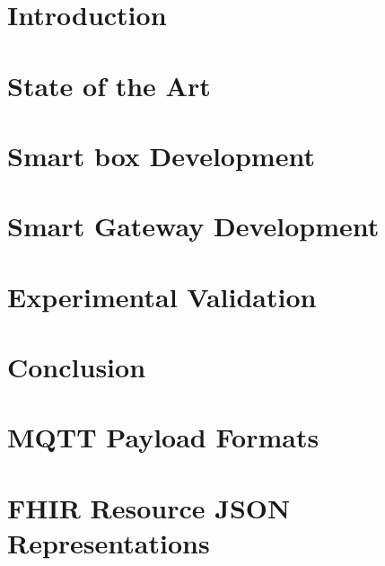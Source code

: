 \documentclass[a4paper, 12pt]{report}
\begin{document}
\listoftables


\newpage
\thispagestyle{empty}
\mbox{}
\chapter{Introduction}


\chapter{State of the Art}
\label{chap:stateofart}


\chapter{Smart box Development}
\label{chap:smartbox}


\chapter{Smart Gateway Development}
\label{chap:gateway}


\chapter{Experimental Validation}
\label{chap:results}


\chapter{Conclusion}
\label{chap:conclusion}






\titleformat{\chapter}[display]	%
{\normalfont\huge\bfseries}{\chaptertitlename\ \thechapter}{20pt}{\Huge}
\begin{appendix}			%
\chapter{\acs{MQTT} Payload Formats}	%
\label{app:mqtt_payloads}

\chapter{\acs{FHIR} Resource \acs{JSON} Representations}	%
\label{app:fhir_payloads}

\end{appendix}
\end{document}
